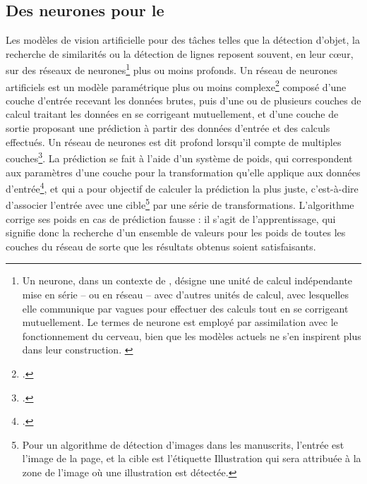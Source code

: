 
\subsection{Des \og neurones \fg pour le \dl}
Les modèles de vision artificielle pour des tâches telles que la détection d'objet, la recherche de similarités ou la détection de lignes reposent souvent, en leur cœur, sur des réseaux de neurones\footnote{Un neurone, dans un contexte de \ml, désigne une unité de calcul indépendante mise en série -- ou en réseau -- avec d'autres unités de calcul, avec lesquelles elle communique par vagues pour effectuer des calculs tout en se corrigeant mutuellement. Le termes de \og neurone \fg est employé par assimilation avec le fonctionnement du cerveau, bien que les modèles actuels ne s'en inspirent plus dans leur construction. \cite{azencottIntroductionAuMachine2018}} plus ou moins profonds. Un réseau de neurones artificiels est un modèle paramétrique plus ou moins complexe\footcite{azencottIntroductionAuMachine2018} composé d'une couche d'entrée recevant les données brutes, puis d'une ou de plusieurs couches de calcul traitant les données en se corrigeant mutuellement, et d'une couche de sortie proposant une prédiction à partir des données d'entrée et des calculs effectués. Un réseau de neurones est dit \og profond \fg lorsqu'il compte de multiples couches\footcite{azencottIntroductionAuMachine2018}. La prédiction se fait à l'aide d'un système de poids, qui correspondent aux paramètres d'une couche pour la transformation qu'elle applique aux données d'entrée\footcite{cholletApprentissageProfondAvec2020a}, et qui a pour objectif de calculer la prédiction la plus juste, c'est-à-dire d'associer l'entrée avec une cible\footnote{Pour un algorithme de détection d'images dans les manuscrits, l'entrée est l'image de la page, et la cible est l'étiquette \og Illustration \fg qui sera attribuée à la zone de l'image où une illustration est détectée.} par une série de transformations. L'algorithme corrige ses poids en cas de prédiction fausse : il s'agit de l'apprentissage, qui signifie donc la recherche d'un ensemble de valeurs pour les poids de toutes les couches du réseau de sorte que les résultats obtenus soient satisfaisants.
    
